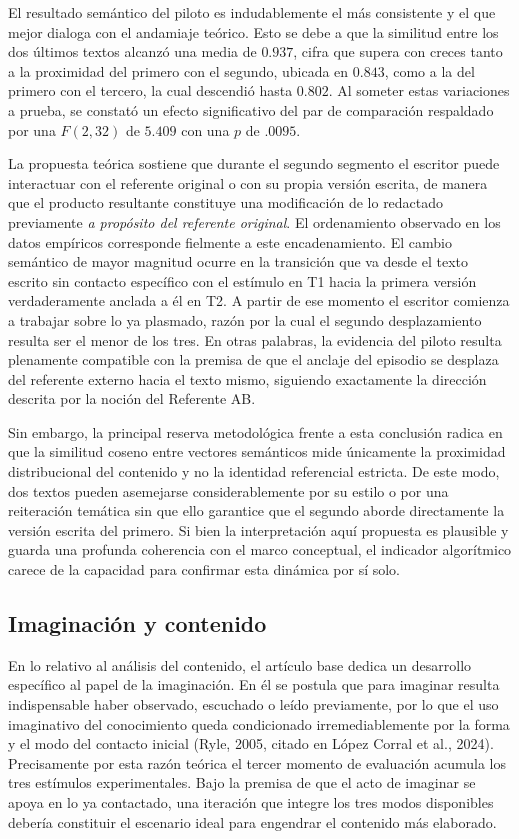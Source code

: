 \documentclass[12pt]{article}
\begin{document}
	El resultado semántico del piloto es indudablemente el más consistente y el que mejor dialoga con el andamiaje teórico. Esto se debe a que la similitud entre los dos últimos textos alcanzó una media de $0.937$, cifra que supera con creces tanto a la proximidad del primero con el segundo, ubicada en $0.843$, como a la del primero con el tercero, la cual descendió hasta $0.802$. Al someter estas variaciones a prueba, se constató un efecto significativo del par de comparación respaldado por una $F(2,32)$ de $5.409$ con una $p$ de $.0095$.
	
	La propuesta teórica sostiene que durante el segundo segmento el escritor puede interactuar con el referente original o con su propia versión escrita, de manera que el producto resultante constituye una modificación de lo redactado previamente \emph{a propósito del referente original}. El ordenamiento observado en los datos empíricos corresponde fielmente a este encadenamiento. El cambio semántico de mayor magnitud ocurre en la transición que va desde el texto escrito sin contacto específico con el estímulo en T1 hacia la primera versión verdaderamente anclada a él en T2. A partir de ese momento el escritor comienza a trabajar sobre lo ya plasmado, razón por la cual el segundo desplazamiento resulta ser el menor de los tres. En otras palabras, la evidencia del piloto resulta plenamente compatible con la premisa de que el anclaje del episodio se desplaza del referente externo hacia el texto mismo, siguiendo exactamente la dirección descrita por la noción del Referente AB.
	
	Sin embargo, la principal reserva metodológica frente a esta conclusión radica en que la similitud coseno entre vectores semánticos mide únicamente la proximidad distribucional del contenido y no la identidad referencial estricta. De este modo, dos textos pueden asemejarse considerablemente por su estilo o por una reiteración temática sin que ello garantice que el segundo aborde directamente la versión escrita del primero. Si bien la interpretación aquí propuesta es plausible y guarda una profunda coherencia con el marco conceptual, el indicador algorítmico carece de la capacidad para confirmar esta dinámica por sí solo.
	
	\subsection{Imaginación y contenido}
	
	En lo relativo al análisis del contenido, el artículo base dedica un desarrollo específico al papel de la imaginación. En él se postula que para imaginar resulta indispensable haber observado, escuchado o leído previamente, por lo que el uso imaginativo del conocimiento queda condicionado irremediablemente por la forma y el modo del contacto inicial (Ryle, 2005, citado en López Corral et al., 2024). Precisamente por esta razón teórica el tercer momento de evaluación acumula los tres estímulos experimentales. Bajo la premisa de que el acto de imaginar se apoya en lo ya contactado, una iteración que integre los tres modos disponibles debería constituir el escenario ideal para engendrar el contenido más elaborado.
	
\end{document}
